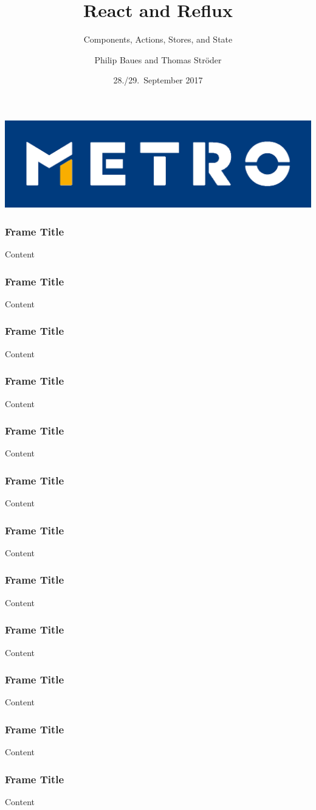 \documentclass{beamer}
\begin{document}
\title[React and Reflux]{React and Reflux}
\subtitle{Components, Actions, Stores, and State}
\author[P.\ Baues, T.\ Str\"oder]{Philip Baues and Thomas Str\"oder}
\date{28./29.\ September 2017}
\newcommand{\location}{\texttt{code.talks} Hamburg}

{
\begin{frame}[plain]
\centering
\includegraphics{metro2.png}
\end{frame}
}

{
\begin{frame}[plain]
\titlepage
\end{frame}
}

\begin{frame}\frametitle{Frame Title}
\centering
Content
\end{frame}

\begin{frame}\frametitle{Frame Title}
\centering
Content
\end{frame}

\begin{frame}\frametitle{Frame Title}
\centering
Content
\end{frame}

\begin{frame}\frametitle{Frame Title}
\centering
Content
\end{frame}

\begin{frame}\frametitle{Frame Title}
\centering
Content
\end{frame}

\begin{frame}\frametitle{Frame Title}
\centering
Content
\end{frame}

\begin{frame}\frametitle{Frame Title}
\centering
Content
\end{frame}

\begin{frame}\frametitle{Frame Title}
\centering
Content
\end{frame}

\begin{frame}\frametitle{Frame Title}
\centering
Content
\end{frame}

\begin{frame}\frametitle{Frame Title}
\centering
Content
\end{frame}

\begin{frame}\frametitle{Frame Title}
\centering
Content
\end{frame}

\begin{frame}\frametitle{Frame Title}
\centering
Content
\end{frame}
\end{document}

